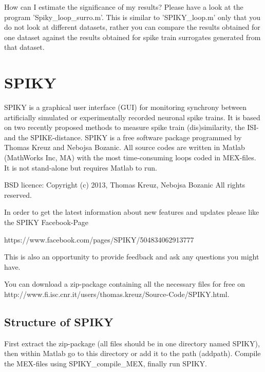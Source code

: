 \documentclass[10pt,twocolumn]{elsart5p}
\begin{document}
How can I estimate the significance of my results?
Please have a look at the program 'Spiky\_loop\_surro.m'. This is similar to 'SPIKY\_loop.m' only that you do not look at different datasets, rather you can compare the results obtained for one dataset against the results obtained for spike train surrogates generated from that dataset.

\section{\label{s:SPIKY} SPIKY}

SPIKY is a graphical user interface (GUI) for monitoring synchrony between artificially simulated or experimentally recorded neuronal spike trains. It is based on two recently proposed methods to measure spike train (dis)similarity, the ISI- and the SPIKE-distance. SPIKY is a free software package programmed by Thomas Kreuz and Nebojsa Bozanic. All source codes are written in Matlab (MathWorks Inc, MA) with the most time-consuming loops coded in MEX-files. It is not stand-alone but requires Matlab to run.

BSD licence:
Copyright (c) 2013, Thomas Kreuz, Nebojsa Bozanic
All rights reserved.

In order to get the latest information about new features and updates please like the SPIKY Facebook-Page

https://www.facebook.com/pages/SPIKY/504834062913777

This is also an opportunity to provide feedback and ask any questions you might have.

You can download a zip-package containing all the necessary files for free on http://www.fi.isc.cnr.it/users/thomas.kreuz/Source-Code/SPIKY.html.



\subsection{\label{ss:Structure} Structure of SPIKY}

First extract the zip-package (all files should be in one directory named SPIKY), then within Matlab go to this directory or add it to the path (addpath). Compile the MEX-files using SPIKY\_compile\_MEX, finally run SPIKY. 
\end{document}

